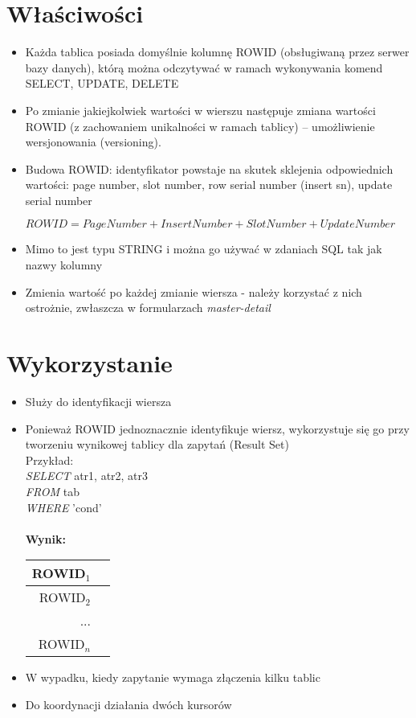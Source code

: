 \documentclass[a4paper,twoside]{article}
\begin{document}
  	\section*{Właściwości}
  	\begin{itemize}
  		\item Każda tablica posiada domyślnie kolumnę ROWID (obsługiwaną przez serwer bazy danych), którą można odczytywać w ramach wykonywania komend SELECT, UPDATE, DELETE
  		\item Po zmianie jakiejkolwiek wartości w wierszu następuje zmiana wartości ROWID (z zachowaniem unikalności w ramach tablicy) – umożliwienie wersjonowania (versioning). 
  		\item Budowa ROWID: identyfikator powstaje na skutek sklejenia odpowiednich wartości: page number, slot number, row serial number (insert sn), update serial number
  		\begin{center}
  			\(ROWID = PageNumber  + InsertNumber + SlotNumber + UpdateNumber\)
  		\end{center}
  		\item Mimo to jest typu STRING i można go używać w zdaniach SQL tak jak nazwy kolumny
  		\item Zmienia wartość po każdej zmianie wiersza - należy korzystać z nich ostrożnie, zwłaszcza w formularzach \emph{master-detail}
  	\end{itemize}
  	\section*{Wykorzystanie}
  	\begin{itemize}
  		\item Służy do identyfikacji wiersza
  		\item Ponieważ ROWID jednoznacznie identyfikuje wiersz, wykorzystuje się go przy tworzeniu wynikowej tablicy dla zapytań (Result Set)\\
  		Przykład:\\
  		\emph{SELECT} atr1, atr2, atr3\\
  		\emph{FROM} tab\\
  		\emph{WHERE} 'cond'\\\\
  		\textbf{Wynik:}\\
  		\begin{tabular}{|r|l|}
  			\hline 
  			ROWID${_1}$\\
  			\hline
  			ROWID${_2}$ \\
  			\hline
  			...\\
  			\hline
  			ROWID${_n}$\\
  			\hline
  		\end{tabular}
  		\item W wypadku, kiedy zapytanie wymaga złączenia kilku tablic
  		\item Do koordynacji działania dwóch kursorów
  	\end{itemize}
  		
\end{document}
